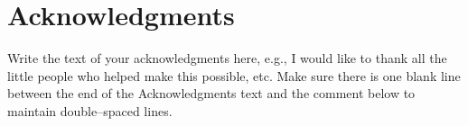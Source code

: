 \documentclass[12pt,letterpaper]{lsuetd}
\begin{document}
\chapter*{Acknowledgments}
\doublespacing
\vspace{0.55ex}
Write the text of your acknowledgments here, e.g., I would like to thank all the little people who helped make this possible, etc.  Make sure there is one blank line between the end of the Acknowledgments text and the comment below to maintain double--spaced lines.

\pagebreak


\singlespacing
\tableofcontents
\pagebreak

\renewcommand\@pnumwidth{1.55em}
\renewcommand\@tocrmarg{8.55em}
\listoftables
\pagebreak
\listoffigures
\pagebreak

\end{document}
